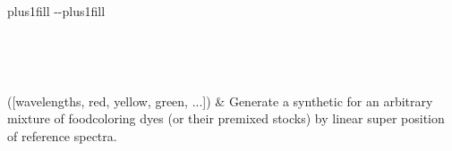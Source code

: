 \documentclass[letterpaper,10pt,english]{sphinxmanual}
\begin{document}
\begin{savenotes}
\sphinxatlongtablestart
\sphinxthistablewithglobalstyle
\sphinxthistablewithnovlinesstyle
\makeatletter
  \LTleft \@totalleftmargin plus1fill
  \LTright\dimexpr\columnwidth-\@totalleftmargin-\linewidth\relax plus1fill
\makeatother
\begin{longtable}{}
\sphinxtoprule
\endfirsthead

\\
\sphinxtoprule
\endhead

\sphinxbottomrule
{}\\
\endfoot

\endlastfoot
\sphinxtableatstartofbodyhook

\sphinxAtStartPar
{\hyperref[\detokenize{generated/photon_canon.contrib.food_coloring:photon_canon.contrib.food_coloring.make_mix}]{}}({[}wavelengths, red, yellow, green, ...{]})
&
\sphinxAtStartPar
Generate a synthetic  for an arbitrary mixture of food\sphinxhyphen{}coloring dyes (or their premixed stocks) by linear super\sphinxhyphen{} position of reference spectra.
\\
\sphinxbottomrule
\end{longtable}
\sphinxtableafterendhook
\sphinxatlongtableend
\end{savenotes}
\end{document}
